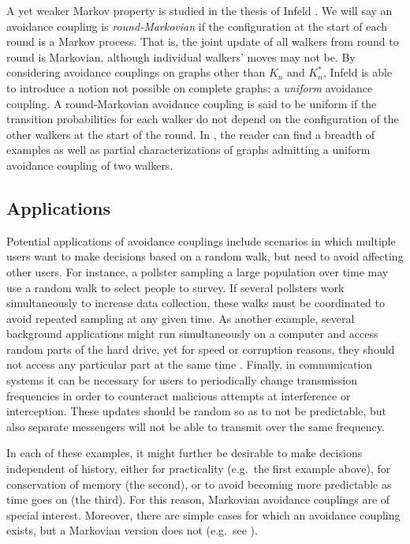 \documentclass[11pt,reqno]{amsart} %
\numberwithin{equation}{section}
\theoremstyle{definition}
\begin{document}
A yet weaker Markov property is studied in the thesis of Infeld \cite{infeld16}.
We will say an avoidance coupling is \textit{round-Markovian} if the configuration at the start of each round is a Markov process.
That is, the joint update of all walkers from round to round is Markovian, although individual walkers' moves may not be.
By considering avoidance couplings on graphs other than $K_n$ and $K_n^*$, Infeld is able to introduce a notion not possible on complete graphs: a \textit{uniform} avoidance coupling.
A round-Markovian avoidance coupling is said to be uniform if the transition probabilities for each walker do not depend on the configuration of the other walkers at the start of the round.
In \cite[Chapter 2]{infeld16}, the reader can find a breadth of examples as well as partial characterizations of graphs admitting a uniform avoidance coupling of two walkers.

\subsection{Applications}
Potential applications of avoidance couplings include scenarios in which multiple users want to make decisions based on a random walk, but need to avoid affecting other users.
For instance, a pollster sampling a large population over time may use a random walk to select people to survey.
If several pollsters work simultaneously to increase data collection, these walks must be coordinated to avoid repeated sampling at any given time.
As another example, several background applications might run simultaneously on a computer and access random parts of the hard drive, yet for speed or corruption reasons, they should not access any particular part at the same time \cite{tsianos13}.
Finally, in communication systems it can be necessary for users to periodically change transmission frequencies in order to counteract malicious attempts at interference or interception.
These updates should be random so as to not be predictable, but also separate messengers will not be able to transmit over the same frequency.

In each of these examples, it might further be desirable to make decisions independent of history, either for practicality (e.g.~the first example above), for conservation of memory (the second), or to avoid becoming more predictable as time goes on (the third).
For this reason, Markovian avoidance couplings are of special interest.
Moreover, there are simple cases for which an avoidance coupling exists, but a Markovian version does not (e.g.~see \cite[Theorem 3.1]{angel-holroyd-martin-wilson-winkler13}).
\end{document}
